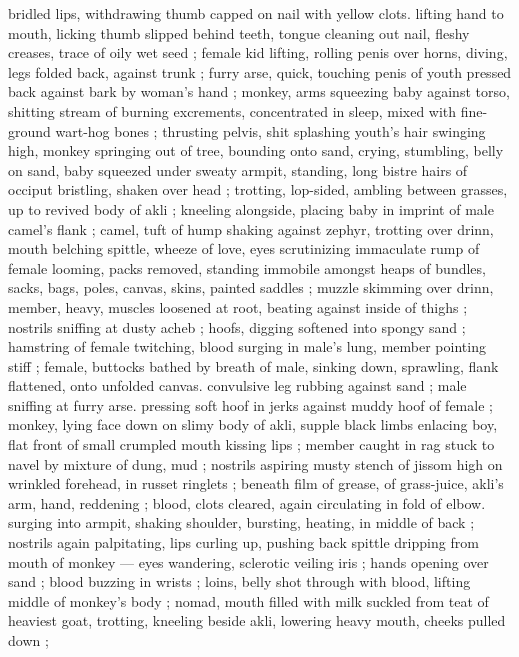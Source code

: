 bridled lips, withdrawing thumb capped on nail with yellow clots. 
lifting hand to mouth, licking thumb slipped behind teeth, tongue 
cleaning out nail, fleshy creases, trace of oily wet seed ; female kid 
lifting, rolling penis over horns, diving, legs folded back, against 
trunk ; furry arse, quick, touching penis of youth pressed back 
against bark by woman's hand ; monkey, arms squeezing baby 
against torso, shitting stream of burning excrements, concentrated 
in sleep, mixed with fine-ground wart-hog bones ; thrusting pelvis, 
shit splashing youth's hair swinging high, monkey springing out of 
tree, bounding onto sand, crying, stumbling, belly on sand, baby 
squeezed under sweaty armpit, standing, long bistre hairs of occiput 
bristling, shaken over head ; trotting, lop-sided, ambling between 
grasses, up to revived body of akli ; kneeling alongside, placing baby 
in imprint of male camel's flank ; camel, tuft of hump shaking against 
zephyr, trotting over drinn, mouth belching spittle, wheeze of love, 
eyes scrutinizing immaculate rump of female looming, packs 
removed, standing immobile amongst heaps of bundles, sacks, bags, 
poles, canvas, skins, painted saddles ; muzzle skimming over drinn, 
member, heavy, muscles loosened at root, beating against inside of 
thighs ; nostrils sniffing at dusty acheb ; hoofs, digging softened into 
spongy sand ; hamstring of female twitching, blood surging in male's 
lung, member pointing stiff ; female, buttocks bathed by breath of 
male, sinking down, sprawling, flank flattened, onto unfolded canvas. 
convulsive leg rubbing against sand ; male sniffing at furry arse. 
pressing soft hoof in jerks against muddy hoof of female ; monkey, 
lying face down on slimy body of akli, supple black limbs enlacing 
boy, flat front of small crumpled mouth kissing lips ; member caught 
in rag stuck to navel by mixture of dung, mud ; nostrils aspiring 
musty stench of jissom high on wrinkled forehead, in russet ringlets 
; beneath film of grease, of grass-juice, akli's arm, hand, reddening 
; blood, clots cleared, again circulating in fold of elbow. surging into 
armpit, shaking shoulder, bursting, heating, in middle of back ; 
nostrils again palpitating, lips curling up, pushing back spittle 
dripping from mouth of monkey --- eyes wandering, sclerotic veiling 
iris ; hands opening over sand ; blood buzzing in wrists ; loins, belly 
shot through with blood, lifting middle of monkey's body ; nomad, 
mouth filled with milk suckled from teat of heaviest goat, trotting, 
kneeling beside akli, lowering heavy mouth, cheeks pulled down ; 
